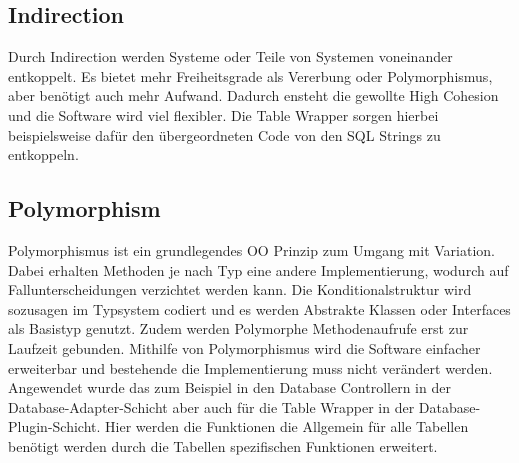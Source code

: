 \subsection{Indirection}
Durch Indirection werden Systeme oder Teile von Systemen voneinander entkoppelt.
Es bietet mehr Freiheitsgrade als Vererbung oder Polymorphismus, aber benötigt auch mehr Aufwand.
Dadurch ensteht die gewollte High Cohesion und die Software wird viel flexibler.
Die Table Wrapper sorgen hierbei beispielsweise dafür den übergeordneten Code von den SQL Strings zu entkoppeln.
\subsection{Polymorphism}
Polymorphismus ist ein grundlegendes OO Prinzip zum Umgang mit Variation.
Dabei erhalten Methoden je nach Typ eine andere Implementierung, wodurch auf Fallunterscheidungen verzichtet werden kann.
Die Konditionalstruktur wird sozusagen im Typsystem codiert und es werden Abstrakte Klassen oder Interfaces als Basistyp genutzt.
Zudem werden Polymorphe Methodenaufrufe erst zur Laufzeit gebunden.
Mithilfe von Polymorphismus wird die Software einfacher erweiterbar und bestehende die Implementierung muss nicht verändert werden.
Angewendet wurde das zum Beispiel in den Database Controllern in der Database-Adapter-Schicht aber auch für die Table Wrapper in der Database-Plugin-Schicht.
Hier werden die Funktionen die Allgemein für alle Tabellen benötigt werden durch die Tabellen spezifischen Funktionen erweitert.
\newpage
